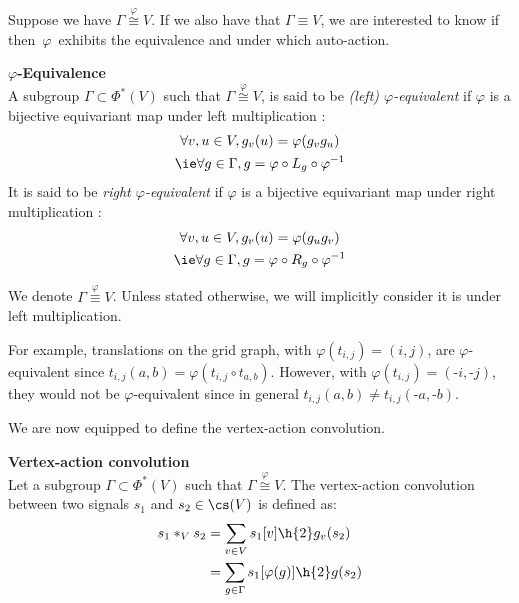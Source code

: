 Suppose we have $\Gamma \overset{\varphi}{\cong} V$. If we also have that $\Gamma \equiv V$, we are interested to know if then~$\varphi$~exhibits the equivalence and under which auto-action.

\begin{definition}\textbf{$\varphi$-Equivalence}\\
A subgroup $\Gamma \subset \Phi^*(V)$ such that $\Gamma \overset{\varphi}{\cong} V$, is said to be \emph{(left) $\varphi$-equivalent} if $\varphi$ is a bijective equivariant map under left multiplication \ie:
\begin{gather}
\forall v, u \in V, g_v(u) = \varphi(g_vg_u) \label{eq:P}\\
\ie \forall g \in \Gamma, g = \varphi \circ L_g \circ \varphi^{-1} \label{eq:PP}
\end{gather}
It is said to be \emph{right $\varphi$-equivalent} if $\varphi$ is a bijective equivariant map under right multiplication \ie:
\begin{gather}
\forall v, u \in V, g_v(u) = \varphi(g_ug_v)\\
\ie \forall g \in \Gamma, g = \varphi \circ R_g \circ \varphi^{-1}
\end{gather}
\end{definition}

We denote $\Gamma \overset{\varphi}{\equiv} V$. Unless stated otherwise, we will implicitly consider it is under left multiplication.

\begin{remark}
For example, translations on the grid graph, with $\varphi(t_{i,j}) = (i,j)$, are $\varphi$-equivalent since $t_{i,j}(a,b) = \varphi(t_{i,j} \circ t_{a,b})$. However, with $\varphi(t_{i,j}) = (\text{-}i,\text{-}j)$, they would not be $\varphi$-equivalent since in general $t_{i,j}(a,b) \neq t_{i,j}(\text{-}a,\text{-}b)$.
\end{remark}

We are now equipped to define the vertex-action convolution.

\begin{definition}\textbf{Vertex-action convolution}\\
Let a subgroup $\Gamma \subset \Phi^*(V)$ such that $\Gamma \overset{\varphi}{\cong} V$.
The vertex-action convolution between two signals $s_1$ and $s_2 \in \cs(V)$ is defined as:
\begin{align}
s_1 \ast_V s_2 & = \displaystyle \sum_{v \in V} s_1[v] \h{2} g_v(s_2)\label{eq:vdom}\\
& = \displaystyle \sum_{g \in \Gamma} s_1[\varphi(g)] \h{2} g(s_2) \label{eq:premix}
\end{align}
\label{def:conv3}
\end{definition}

